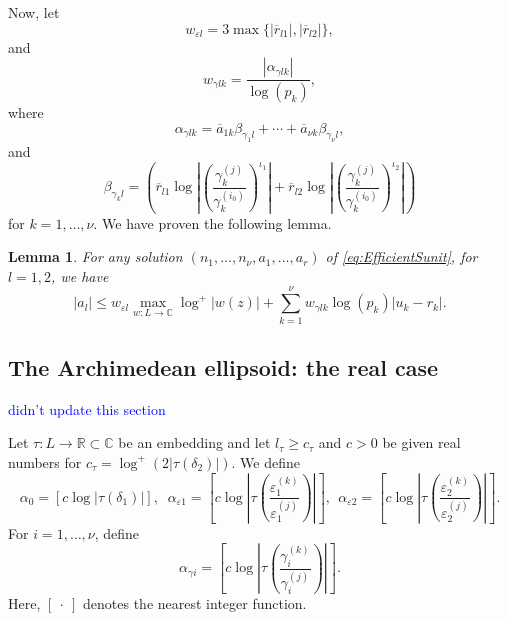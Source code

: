 \documentclass[11pt]{report}
\newtheorem{lemma}[theorem]{Lemma}
\theoremstyle{definition}
\newcommand{\eps}{\varepsilon}
\newcommand{\edit}[1]{\textcolor{blue}{#1}}
\begin{document}
Now, let
\begin{equation} \label{eq:wepslk}
w_{\eps l} = 3\max\{|\overline{r}_{l1}|, |\overline{r}_{l2}|\},
\end{equation}
and
\begin{equation} \label{eq:wgammalk}
w_{\gamma l k} = \frac{|\alpha_{\gamma l k}|}{\log(p_k)},
\end{equation}
where
\[\alpha_{\gamma l k} = \overline{a}_{1k}\beta_{\gamma_1 l} + \cdots + \overline{a}_{\nu k}\beta_{\gamma_{\nu} l},\]
and
\[\beta_{\gamma_k l} = \left(\overline{r}_{l1} \log\left| \left( \frac{\gamma_k^{(j)}}{\gamma_k^{(i_0)}}\right)^{\iota_1}\right|+ \overline{r}_{l2}\log\left| \left( \frac{\gamma_k^{(j)}}{\gamma_k^{(i_0)}}\right)^{\iota_2}\right|\right)\]
for $k = 1, \dots, \nu$. We have proven the following lemma.
\begin{lemma}\label{lem:mepsbound}
For any solution $(n_1, \dots, n_{\nu},a_1, \dots, a_r)$ of \eqref{eq:EfficientSunit}, for $l =1,2$, we have
\[|a_l| \leq w_{\eps l}\max_{w:L \to \mathbb{C}} \log^+|w(z)| + \sum_{k = 1}^{\nu} w_{\gamma l k}\log(p_k)|u_k - r_k|.\]
\end{lemma}


\subsection{The Archimedean ellipsoid: the real case}
\label{subsec:ArchEllipsoid}

\edit{didn't update this section}

Let $\tau:L\to\mathbb{R} \subset \mathbb{C}$ be an embedding and let $l_\tau\geq c_\tau$ and $c>0$ be given real numbers for $c_\tau=\log^+(2|\tau(\delta_2)|)$. We define
\begin{equation} \label{eq:alpha0eps}
\alpha_0 = [c\log|\tau(\delta_1)|], \;  \; \alpha_{\varepsilon 1} =  \left[c\log\left|\tau\left(\frac{\varepsilon_1^{(k)}}{\varepsilon_1^{(j)}}\right)\right|\right],\ \  \alpha_{\varepsilon 2} =  \left[c\log\left|\tau\left(\frac{\varepsilon_2^{(k)}}{\varepsilon_2^{(j)}}\right)\right|\right].
\end{equation}
For $i = 1, \dots, \nu$, define
\begin{equation} \label{eq:alphagamma}
\alpha_{\gamma i} = \left[c\log\left|\tau\left(\frac{\gamma_i^{(k)}}{\gamma_i^{(j)}}\right)\right|\right].
\end{equation}
Here, $[ \ \cdot\  ]$ denotes the nearest integer function.
\end{document}
